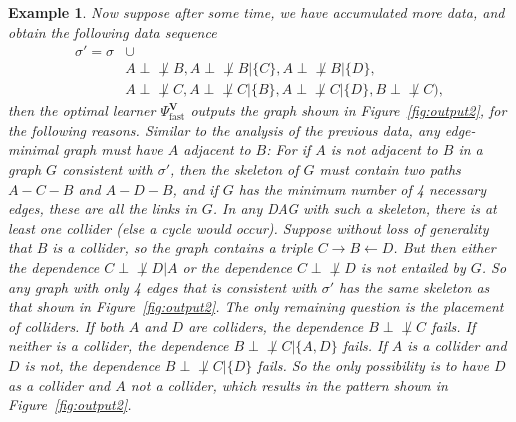 \documentclass{elsarticle}%
\newtheorem{example}[theorem]{Example}
\newcommand{\set}[1]{\{#1\}}
\newcommand{\dep}{\ensuremath{{\perp{}\!\!\!\!\!\!\!\not  \perp{}}}}
\newcommand{\A}{A}
\newcommand{\B}{B}
\newcommand{\C}{C}
\newcommand{\G}{G}
\newcommand{\fast}{\mathrm{fast}}
\begin{document}
\begin{example}
  Now suppose after some time, we have accumulated more data, and obtain the following data sequence
  \begin{align*}
    \sigma' = \sigma & \cup\\
&A\dep B, A\dep B|\set{C}, A\dep B|\set{D},\\
&A\dep C, A\dep C|\set{B}, A\dep C|\set{D}, B\dep C ),
  \end{align*}
 then the optimal learner $\Psi_{\fast}^{\mathbf{V}}$ outputs the graph shown in Figure~\ref{fig:output2}, for the following reasons. Similar to the analysis of the previous data, any edge-minimal graph must have $\A$ adjacent to $\B$: For if $\A$ is not adjacent to $\B$ in a graph $\G$ consistent with $\sigma'$, then the skeleton of $\G$ must contain two paths $\A - \C - \B$ and $\A - D - \B$, and if $\G$ has the minimum number of 4 necessary edges, these are all the links in $\G$. In any DAG with such a skeleton, there is at least one collider (else a cycle would occur). Suppose without loss of generality that $\B$ is a collider, so the graph contains a triple $\C \rightarrow \B \leftarrow D$. But then either the dependence $\C \dep D|\A$ or the dependence $\C \dep D$ is not entailed by $\G$. So any graph with only 4 edges that is consistent with $\sigma'$ has the same skeleton as that shown in Figure~\ref{fig:output2}. The only remaining question is the placement of colliders. If both $\A$ and $D$ are colliders, the dependence $\B \dep \C$ fails. If neither is a collider, the dependence $\B \dep \C|\{\A,D\}$ fails. If $\A$ is a collider and $D$ is not, the dependence $\B \dep \C|\{D\}$ fails. So the only possibility is to have $D$ as a collider and $\A$ not a collider, which results in the pattern shown in Figure~\ref{fig:output2}.
  \begin{figure}[h]
    \centering
\end{figure}
\end{example}
\end{document}
